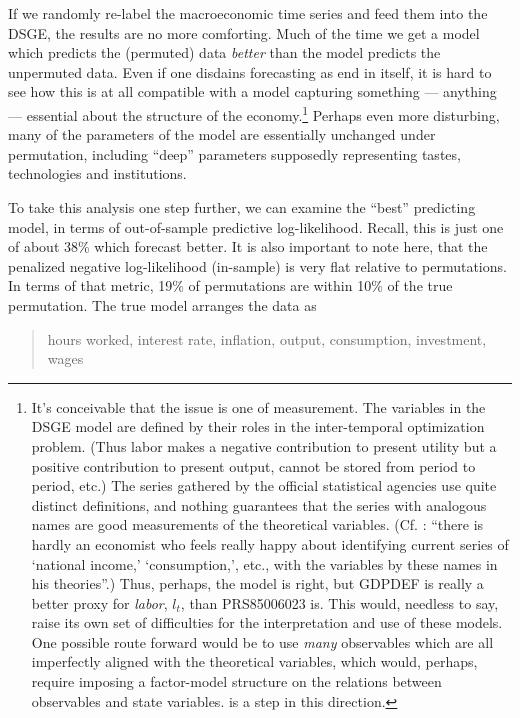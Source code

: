 \documentclass[11pt]{article}
\begin{document}
If we randomly re-label the macroeconomic time series and feed them into
the DSGE, the results are no more comforting. Much of the time we get a
model which predicts the (permuted) data \emph{better} than the model
predicts the unpermuted data. Even if one disdains forecasting as end in
itself, it is hard to see how this is at all compatible with a model
capturing something --- anything --- essential about the structure of
the economy.\footnote{It's conceivable that the issue is one of
  measurement. The variables in the DSGE model are defined by their
  roles in the inter-temporal optimization problem. (Thus labor makes a
  negative contribution to present utility but a positive contribution
  to present output, cannot be stored from period to period, etc.) The
  series gathered by the official statistical agencies use quite
  distinct definitions, and nothing guarantees that the series with
  analogous names are good measurements of the theoretical variables.
  (Cf. \citet[p. 6]{Haavelmo-probability-approach}: ``there is hardly an
  economist who feels really happy about identifying current series of
  `national income,' `consumption,', etc., with the variables by these
  names in his theories''.) Thus, perhaps, the model is right, but
  GDPDEF is really a better proxy for \emph{labor}, \(l_t\), than
  PRS85006023 is. This would, needless to say, raise its own set of
  difficulties for the interpretation and use of these models. One
  possible route forward would be to use \emph{many} observables which
  are all imperfectly aligned with the theoretical variables, which
  would, perhaps, require imposing a factor-model structure on the
  relations between observables and state variables.
  \citet{Boivin-Giannoni-DSGEs-in-data-rich-environment} is a step in
  this direction.} Perhaps even more disturbing, many of the parameters
of the model are essentially unchanged under permutation, including
``deep'' parameters supposedly representing tastes, technologies and
institutions.

To take this analysis one step further, we can examine the ``best''
predicting model, in terms of out-of-sample predictive log-likelihood.
Recall, this is just one of about 38\% which forecast better. It is also
important to note here, that the penalized negative log-likelihood
(in-sample) is very flat relative to permutations. In terms of that
metric, 19\% of permutations are within 10\% of the true permutation.
The true model arranges the data as

\begin{quotation}
hours worked, interest rate, inflation, output, consumption, investment, wages
\end{quotation}
\end{document}
